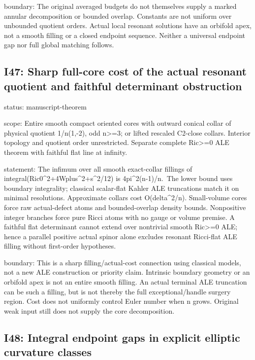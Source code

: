 \documentclass[
  10pt,
]{article}
\begin{document}
boundary: The original averaged budgets do not themselves supply a
marked annular decomposition or bounded overlap. Constants are not
uniform over unbounded quotient orders. Actual local resonant solutions
have an orbifold apex, not a smooth filling or a closed endpoint
sequence. Neither a universal endpoint gap nor full global matching
follows.

\hypertarget{i47-sharp-full-core-cost-of-the-actual-resonant-quotient-and-faithful-determinant-obstruction}{%
\subsection{I47: Sharp full-core cost of the actual resonant quotient
and faithful determinant
obstruction}\label{i47-sharp-full-core-cost-of-the-actual-resonant-quotient-and-faithful-determinant-obstruction}}

status: manuscript-theorem

scope: Entire smooth compact oriented cores with outward conical collar
of physical quotient 1/n(1,-2), odd n\textgreater=3; or lifted rescaled
C2-close collars. Interior topology and quotient order unrestricted.
Separate complete Ric\textgreater=0 ALE theorem with faithful flat line
at infinity.

statement: The infimum over all smooth exact-collar fillings of
integral(Ric0\^{}2+4Wplus\^{}2+s\^{}2/12) is 4pi\^{}2(n-1)/n.~The lower
bound uses boundary integrality; classical scalar-flat Kahler ALE
truncations match it on minimal resolutions. Approximate collars cost
O(delta\^{}2/n). Small-volume cores force raw actual-defect atoms and
bounded-overlap density bounds. Nonpositive integer branches force pure
Ricci atoms with no gauge or volume premise. A faithful flat determinant
cannot extend over nontrivial smooth Ric\textgreater=0 ALE; hence a
parallel positive actual spinor alone excludes resonant Ricci-flat ALE
filling without first-order hypotheses.

boundary: This is a sharp filling/actual-cost connection using classical
models, not a new ALE construction or priority claim. Intrinsic boundary
geometry or an orbifold apex is not an entire smooth filling. An actual
terminal ALE truncation can be such a filling, but is not thereby the
full exceptional/handle surgery region. Cost does not uniformly control
Euler number when n grows. Original weak input still does not supply the
core decomposition.

\hypertarget{i48-integral-endpoint-gaps-in-explicit-elliptic-curvature-classes}{%
\subsection{I48: Integral endpoint gaps in explicit elliptic curvature
classes}\label{i48-integral-endpoint-gaps-in-explicit-elliptic-curvature-classes}}
\end{document}
